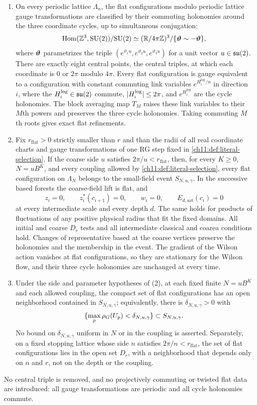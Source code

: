 \begin{lemma}\label{ch11:lem:flat-lifts}
\begin{enumerate}
\item On every periodic lattice $\Lambda_n$, the flat configurations modulo periodic lattice gauge transformations are classified by their commuting holonomies around the three coordinate cycles, up to simultaneous conjugation:
\[
 \operatorname{Hom}(\mathbb Z^3,\mathrm{SU}(2))/\mathrm{SU}(2)\simeq(\mathbb R/4\pi\mathbb Z)^3/\{\bm\vartheta\sim-\bm\vartheta\},
\]
where $\bm\vartheta$ parametrizes the triple $(e^{\vartheta_1u},e^{\vartheta_2u},e^{\vartheta_3u})$ for a unit vector $u\in\mathfrak{su}(2)$. There are exactly eight central points, the central triples, at which each coordinate is $0$ or $2\pi$ modulo $4\pi$. Every flat configuration is gauge equivalent to a configuration with constant commuting link variables $e^{H^{\log}_i/n}$ in direction $i$, where the $H^{\log}_i\in\mathfrak{su}(2)$ commute, $\lvert H^{\log}_i\rvert\le2\pi$, and $e^{H^{\log}_i}$ are the cycle holonomies. The block averaging map $T_M$ raises these link variables to their $M$th powers and preserves the three cycle holonomies. Taking commuting $M$th roots gives exact flat refinements.
\item Fix $r_{\mathrm{flat}}>0$ strictly smaller than $r$ and than the radii of all real coordinate charts and gauge transformations of one RG step fixed in \cref{ch11:def:literal-selection}. If the coarse side $u$ satisfies $2\pi/u<r_{\mathrm{flat}}$, then, for every $K\ge0$, $N=uB^K$, and every coupling allowed by \cref{ch11:def:literal-selection}, every flat configuration on $\Lambda_N$ belongs to the small-field event $S_{N,u,\gamma}$. In the successive based forests the coarse-field lift is flat, and
\[
 z_i=0,\qquad z_i^*(c_{i+1})=0,\qquad w_i=0,\qquad E_{d,\mathrm{sat}}(c_i)=0
\]
at every intermediate scale and every depth $d$. The same holds for products of fluctuations of any positive physical radius that fit the fixed domains. All initial and coarse $D_r$ tests and all intermediate classical and coarea conditions hold. Changes of representative based at the coarse vertices preserve the holonomies and the membership in the event. The gradient of the Wilson action vanishes at flat configurations, so they are stationary for the Wilson flow, and their three cycle holonomies are unchanged at every time.
\item Under the side and parameter hypotheses of (2), at each fixed finite $N=uB^K$ and each allowed coupling, the compact set of flat configurations has an open neighborhood contained in $S_{N,u,\gamma}$; equivalently, there is $\delta_{N,u,\gamma}>0$ with
\[
 \{\max_p\rho_G(U_p)<\delta_{N,u,\gamma}\}\subset S_{N,u,\gamma}.
\]
No bound on $\delta_{N,u,\gamma}$ uniform in $N$ or in the coupling is asserted. Separately, on a fixed stopping lattice whose side $n$ satisfies $2\pi/n<r_{\mathrm{flat}}$, the set of flat configurations lies in the open set $D_r$, with a neighborhood that depends only on $n$ and $r$, not on the depth or the coupling.
\end{enumerate}
No central triple is removed, and no projectively commuting or twisted flat data are introduced: all gauge transformations are periodic and all cycle holonomies commute.
\end{lemma}


